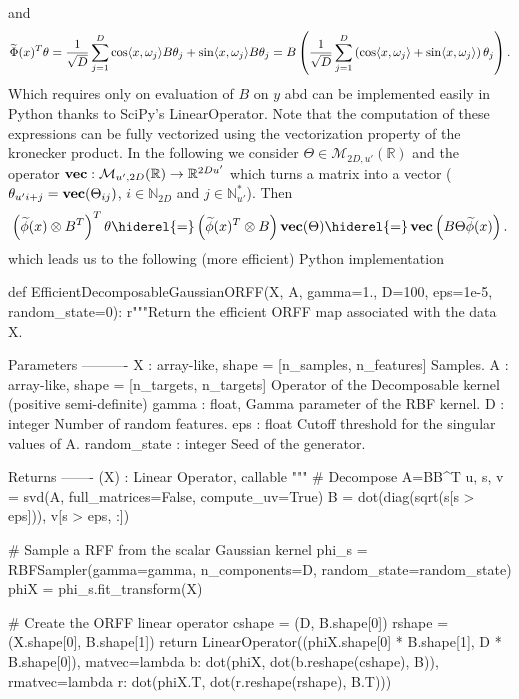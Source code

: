 and
\begin{dmath}
\label{eq:phi_transpose_efficient}
\tildePhi{\omega}(x)^T\theta = \frac{1}{\sqrt{D}} \sum_{j=1}^D \cos\inner{x, \omega_j}B\theta_j + \sin\inner{x, \omega_j}B\theta_j = B\left(\frac{1}{\sqrt{D}} \sum_{j=1}^D \left(\cos\inner{x, \omega_j} + \sin\inner{x, \omega_j}\right)\theta_j\right).
\end{dmath}
Which requires only on evaluation of $B$ on $y$ abd can be implemented easily in Python thanks to SciPy's LinearOperator. Note that the computation of these expressions can be fully vectorized using the vectorization property of the kronecker product. In the following we consider $\Theta \in \mathcal{M}_{2D,u'}(\mathbb{R})$ and the operator $\operatorname{\mathbf{vec}}: \mathcal{M}_{u',2D}(\mathbb{R}) \to \mathbb{R}^{2Du'}$ which turns a matrix into a vector (\ie~$\theta_{u'i+j} = \operatorname{\mathbf{vec}}(\Theta_{ij})$, $i\in\mathbb{N}_{2D}$ and $j\in\mathbb{N}^*_{u'}$). Then
\begin{dmath*}
\left(\tildephi{\omega}(x) \otimes B^T\right)^T \theta \hiderel{=} \left(\tildephi{\omega}(x)^T \otimes B\right) \vectorize(\Theta) \hiderel{=} \vectorize\left(B \Theta \tildephi{\omega}(x) \right).
\end{dmath*}
which leads us to the following (more efficient) Python implementation
\begin{pyblock}
def EfficientDecomposableGaussianORFF(X, A, gamma=1.,
                                 D=100, eps=1e-5, random_state=0):
    r"""Return the efficient ORFF map associated with the data X.

    Parameters
    ----------
    X : {array-like}, shape = [n_samples, n_features]
        Samples.
    A : {array-like}, shape = [n_targets, n_targets]
        Operator of the Decomposable kernel (positive semi-definite)
    gamma : {float},
        Gamma parameter of the RBF kernel.
    D : {integer}
        Number of random features.
    eps : {float}
        Cutoff threshold for the singular values of A.
    random_state : {integer}
        Seed of the generator.

    Returns
    -------
    \tilde{\Phi}(X) : Linear Operator, callable
    """
    # Decompose A=BB^T
    u, s, v = svd(A, full_matrices=False, compute_uv=True)
    B = dot(diag(sqrt(s[s > eps])), v[s > eps, :])

    # Sample a RFF from the scalar Gaussian kernel
    phi_s = RBFSampler(gamma=gamma, n_components=D, random_state=random_state)
    phiX = phi_s.fit_transform(X)

    # Create the ORFF linear operator
    cshape = (D, B.shape[0])
    rshape = (X.shape[0], B.shape[1])
    return LinearOperator((phiX.shape[0] * B.shape[1], D * B.shape[0]),
                          matvec=lambda b: dot(phiX, dot(b.reshape(cshape),
                                               B)),
                          rmatvec=lambda r: dot(phiX.T, dot(r.reshape(rshape),
                                                B.T)))
\end{pyblock}

